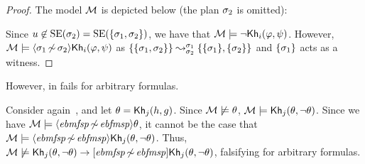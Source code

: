 \begin{proof}
The model $\modults$ is depicted below (the plan $\plan_2$ is omitted):

\begin{center}
\end{center}

Since $u \not\in \stexec(\plan_2) = \stexec(\set{\plan_1,\plan_2})$, we have that $\modults \models \neg\khi(\varphi,\psi)$.
However, $\modults \models \refdiam{\plan_1}{\plan_2}\khi(\varphi,\psi)$ as $\splitstr{\set{\set{\plan_1,\plan_2}}}{\set{\set{\plan_1},\set{\plan_2}}}{\plan_1}{\plan_2}$ and $\set{\plan_1}$ acts as a witness.
\end{proof}

However,  in  fails for arbitrary formulas.

\medskip

\begin{example}
Consider again~, and let $\theta = \kh_j(h,g)$. Since $\modults \not\models \theta$, $\modults \models \kh_j(\theta,\neg \theta)$. Since we have $\modults\models\refdiam{\mathit{ebmfsp}}{\mathit{ebfmsp}}\theta$, it cannot be the case that  $\modults \models \refdiam{\mathit{ebmfsp}}{\mathit{ebfmsp}}\kh_j(\theta,\neg \theta)$. Thus, $\modults \not\models \kh_j(\theta,\neg \theta) \ra \refbox{\mathit{ebmfsp}}{\mathit{ebfmsp}}\kh_j(\theta,\neg \theta)$, falsifying  for arbitrary formulas.
\end{example}

\medskip

